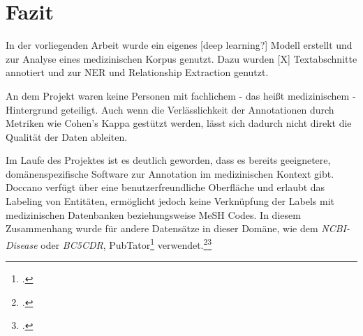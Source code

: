 \section{Fazit}
In der vorliegenden Arbeit wurde ein eigenes [deep learning?] Modell erstellt und zur Analyse eines medizinischen Korpus genutzt. Dazu wurden [X] Textabschnitte annotiert und zur \acf*{NER} und Relationship Extraction genutzt.

An dem Projekt waren keine Personen mit fachlichem - das heißt medizinischem - Hintergrund geteiligt. Auch wenn die Verlässlichkeit der Annotationen durch Metriken wie Cohen's Kappa gestützt werden, lässt sich dadurch nicht direkt die Qualität der Daten ableiten.

Im Laufe des Projektes ist es deutlich geworden, dass es bereits geeignetere, domänenspezifische Software zur Annotation im medizinischen Kontext gibt. Doccano verfügt über eine benutzerfreundliche Oberfläche und erlaubt das Labeling von Entitäten, ermöglicht jedoch keine Verknüpfung der Labels mit medizinischen Datenbanken beziehungsweise \ac{MeSH} Codes. In diesem Zusammenhang wurde für andere Datensätze in dieser Domäne, wie dem \textit{NCBI-Disease} oder \textit{BC5CDR}, PubTator\footcite{wei2013} verwendet.\footcite[vgl.][S.9]{dogan2014}\footcite[vgl.][S.4]{li2016}

